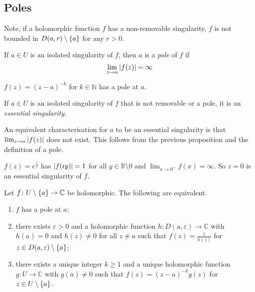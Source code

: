 \subsection{Poles}
Note, if a holomorphic function \( f \) has a non-removable singularity, \( f \) is not bounded in \( D(a,r) \setminus \qty{a} \) for any \( r > 0 \).
\begin{definition}
	If \( a \in U \) is an isolated singularity of \( f \), then \( a \) is a \textit{pole} of \( f \) if
	\[
		\lim_{z \to a} \abs{f(z)} = \infty
	\]
\end{definition}
\begin{example}
	\( f(z) = (z-a)^{-k} \) for \( k \in \mathbb N \) has a pole at \( a \).
\end{example}
\begin{definition}
	If \( a \in U \) is an isolated singularity of \( f \) that is not removable or a pole, it is an \textit{essential singularity}.
\end{definition}
\begin{remark}
	An equivalent characterisation for \( a \) to be an essential singularity is that \( \lim_{z \to a} \abs{f(z)} \) does not exist.
	This follows from the previous proposition and the definition of a pole.
\end{remark}
\begin{example}
	\( f(z) = e^{\frac{1}{z}} \) has \( \abs{f(iy)} = 1 \) for all \( y \in \mathbb R \setminus \qty{0} \) and \( \lim_{x \to 0^+} f(x) = \infty \).
	So \( z = 0 \) is an essential singularity of \( f \).
\end{example}
\begin{proposition}
	Let \( f \colon U \setminus \qty{a} \to \mathbb C \) be holomorphic.
	The following are equivalent.
	\begin{enumerate}
		\item \( f \) has a pole at \( a \);
		\item there exists \( \varepsilon > 0 \) and a holomorphic function \( h \colon D(a,\varepsilon) \to \mathbb C \) with \( h(a) = 0 \) and \( h(z) \neq 0 \) for all \( z \neq a \) such that \( f(z) = \frac{1}{h(z)} \) for \( z \in D(a,\varepsilon) \setminus \qty{a} \);
		\item there exists a unique integer \( k \geq 1 \) and a unique holomorphic function \( g \colon U \to \mathbb C \) with \( g(a) \neq 0 \) such that \( f(z) = (z-a)^{-k} g(z) \) for \( z \in U \setminus \qty{a} \).
	\end{enumerate}
\end{proposition}
